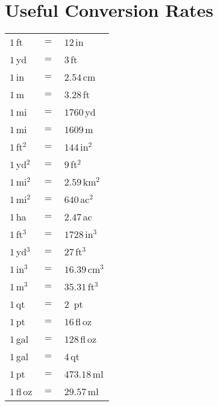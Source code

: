 
\section*{Useful Conversion Rates}

\bigskip 
\begin{center}
\renewcommand{\arraystretch}{1.5}
\begin{tabular}{L{1.1cm}L{0.8cm}L{1.8cm}}
\toprule
$1$\,ft       & $=$    & $12$\,in \\
$1$\,yd       & $=$    & $3$\,ft \\
$1$\,in       & $=$    & $2.54$\,cm \\
$1$\,m        & $=$    & $3.28$\,ft \\
$1$\,mi       & $=$    & $1760$\,yd \\
$1$\,mi       & $=$    & $1609$\,m \\
\midrule
$1$\,ft$^2$   & $=$    & $144$\,in$^2$ \\
$1$\,yd$^2$   & $=$    & $9$\,ft$^2$ \\
$1$\,mi$^2$   & $=$    & $2.59$\,km$^2$ \\
$1$\,mi$^2$   & $=$    & $640$\,ac$^2$ \\
$1$\,ha       & $=$    & $2.47$\,ac \\
\midrule
$1$\,ft$^3$   & $=$    & $1728$\,in$^3$ \\
$1$\,yd$^3$   & $=$    & $27$\,ft$^3$ \\
$1$\,in$^3$   & $=$    & $16.39$\,cm$^3$ \\
$1$\,m$^3$    & $=$    & $35.31$\,ft$^3$ \\
\midrule
$1$\,qt       & $=$    & $2$~pt \\
$1$\,pt       & $=$    & $16$\,fl\,oz \\
$1$\,gal      & $=$    & $128$\,fl\,oz \\
$1$\,gal      & $=$    & $4$\,qt \\
$1$\,pt       & $=$    & $473.18$\,ml \\
$1$\,fl\,oz   & $=$    & $29.57$\,ml \\
\bottomrule
\end{tabular}
\end{center}
